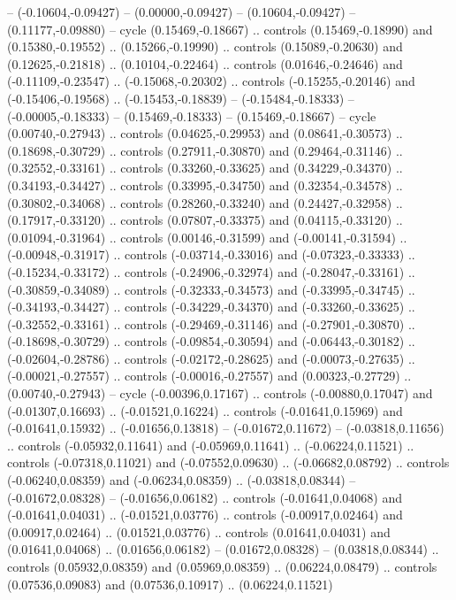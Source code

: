 {{-- (-0.10604,-0.09427)
-- (0.00000,-0.09427)
-- (0.10604,-0.09427)
-- (0.11177,-0.09880)
-- cycle
(0.15469,-0.18667)
.. controls (0.15469,-0.18990) and (0.15380,-0.19552) .. (0.15266,-0.19990)
.. controls (0.15089,-0.20630) and (0.12625,-0.21818) .. (0.10104,-0.22464)
.. controls (0.01646,-0.24646) and (-0.11109,-0.23547) .. (-0.15068,-0.20302)
.. controls (-0.15255,-0.20146) and (-0.15406,-0.19568) .. (-0.15453,-0.18839)
-- (-0.15484,-0.18333)
-- (-0.00005,-0.18333)
-- (0.15469,-0.18333)
-- (0.15469,-0.18667)
-- cycle
(0.00740,-0.27943)
.. controls (0.04625,-0.29953) and (0.08641,-0.30573) .. (0.18698,-0.30729)
.. controls (0.27911,-0.30870) and (0.29464,-0.31146) .. (0.32552,-0.33161)
.. controls (0.33260,-0.33625) and (0.34229,-0.34370) .. (0.34193,-0.34427)
.. controls (0.33995,-0.34750) and (0.32354,-0.34578) .. (0.30802,-0.34068)
.. controls (0.28260,-0.33240) and (0.24427,-0.32958) .. (0.17917,-0.33120)
.. controls (0.07807,-0.33375) and (0.04115,-0.33120) .. (0.01094,-0.31964)
.. controls (0.00146,-0.31599) and (-0.00141,-0.31594) .. (-0.00948,-0.31917)
.. controls (-0.03714,-0.33016) and (-0.07323,-0.33333) .. (-0.15234,-0.33172)
.. controls (-0.24906,-0.32974) and (-0.28047,-0.33161) .. (-0.30859,-0.34089)
.. controls (-0.32333,-0.34573) and (-0.33995,-0.34745) .. (-0.34193,-0.34427)
.. controls (-0.34229,-0.34370) and (-0.33260,-0.33625) .. (-0.32552,-0.33161)
.. controls (-0.29469,-0.31146) and (-0.27901,-0.30870) .. (-0.18698,-0.30729)
.. controls (-0.09854,-0.30594) and (-0.06443,-0.30182) .. (-0.02604,-0.28786)
.. controls (-0.02172,-0.28625) and (-0.00073,-0.27635) .. (-0.00021,-0.27557)
.. controls (-0.00016,-0.27557) and (0.00323,-0.27729) .. (0.00740,-0.27943)
-- cycle
(-0.00396,0.17167)
.. controls (-0.00880,0.17047) and (-0.01307,0.16693) .. (-0.01521,0.16224)
.. controls (-0.01641,0.15969) and (-0.01641,0.15932) .. (-0.01656,0.13818)
-- (-0.01672,0.11672)
-- (-0.03818,0.11656)
.. controls (-0.05932,0.11641) and (-0.05969,0.11641) .. (-0.06224,0.11521)
.. controls (-0.07318,0.11021) and (-0.07552,0.09630) .. (-0.06682,0.08792)
.. controls (-0.06240,0.08359) and (-0.06234,0.08359) .. (-0.03818,0.08344)
-- (-0.01672,0.08328)
-- (-0.01656,0.06182)
.. controls (-0.01641,0.04068) and (-0.01641,0.04031) .. (-0.01521,0.03776)
.. controls (-0.00917,0.02464) and (0.00917,0.02464) .. (0.01521,0.03776)
.. controls (0.01641,0.04031) and (0.01641,0.04068) .. (0.01656,0.06182)
-- (0.01672,0.08328)
-- (0.03818,0.08344)
.. controls (0.05932,0.08359) and (0.05969,0.08359) .. (0.06224,0.08479)
.. controls (0.07536,0.09083) and (0.07536,0.10917) .. (0.06224,0.11521)
}}
